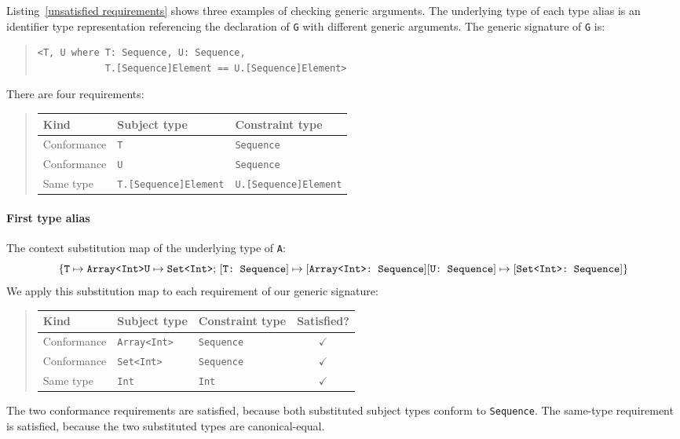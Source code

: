 \documentclass[../generics]{subfiles}
\begin{document}
\begin{example}
Listing~\ref{unsatisfied requirements} shows three examples of checking generic arguments. The underlying type of each type alias is an identifier type representation referencing the declaration of \texttt{G} with different generic arguments. The generic signature of \texttt{G} is:
\begin{quote}
\begin{verbatim}
<T, U where T: Sequence, U: Sequence,
            T.[Sequence]Element == U.[Sequence]Element>
\end{verbatim}
\end{quote}
There are four requirements:
\begin{quote}
\begin{tabular}{|l|l|l|}
\hline
Kind&Subject type&Constraint type\\
\hline
Conformance&\texttt{T}&\texttt{Sequence}\\
Conformance&\texttt{U}&\texttt{Sequence}\\
Same type&\texttt{T.[Sequence]Element}&\texttt{U.[Sequence]Element}\\
\hline
\end{tabular}
\end{quote}

\paragraph{First type alias} The context substitution map of the underlying type of \texttt{A}:
\[
\SubstMapC{
\SubstType{T}{Array<Int>}\\
\SubstType{U}{Set<Int>}
}{
\SubstConf{T}{Array<Int>}{Sequence}\\
\SubstConf{U}{Set<Int>}{Sequence}
}
\]
We apply this substitution map to each requirement of our generic signature:
\begin{quote}
\begin{tabular}{|l|l|l|c|}
\hline
Kind&Subject type&Constraint type&Satisfied?\\
\hline
Conformance&\texttt{Array<Int>}&\texttt{Sequence}&$\checkmark$\\
Conformance&\texttt{Set<Int>}&\texttt{Sequence}&$\checkmark$\\
Same type&\texttt{Int}&\texttt{Int}&$\checkmark$\\
\hline
\end{tabular}
\end{quote}
The two conformance requirements are satisfied, because both substituted subject types conform to \texttt{Sequence}. The same-type requirement is satisfied, because the two substituted types are canonical-equal.


\end{example}
\end{document}
